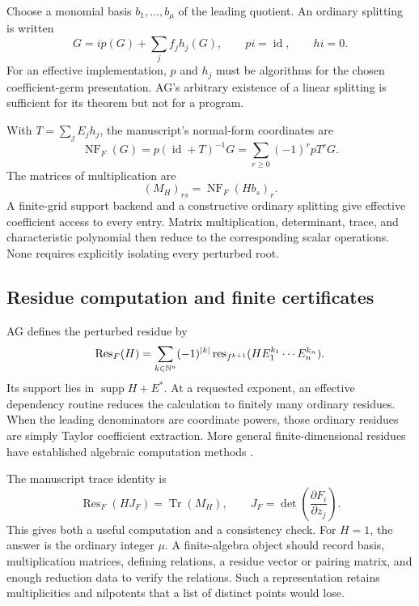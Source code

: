 \documentclass[11pt,letterpaper]{article}
\theoremstyle{definition}\newtheorem{definition}[theorem]{Definition}
\theoremstyle{remark}\newtheorem{remark}[theorem]{Remark}
\newcommand{\supp}{\operatorname{supp}}\newcommand{\lc}{\operatorname{lc}}
\newcommand{\Res}{\operatorname{Res}}\newcommand{\res}{\operatorname{res}}
\newcommand{\NF}{\operatorname{NF}}\newcommand{\Tr}{\operatorname{Tr}}
\newcommand{\id}{\operatorname{id}}\newcommand{\vH}{v_{\!H}}
\numberwithin{equation}{section}\setcounter{tocdepth}{2}
\begin{document}
Choose a monomial basis $b_1,\ldots,b_\mu$ of the leading quotient. An ordinary splitting is written
\[
 G=i p(G)+\sum_j f_jh_j(G),\qquad pi=\id,\qquad hi=0.
\]
For an effective implementation, $p$ and $h_j$ must be algorithms for the chosen coefficient-germ presentation. AG's arbitrary existence of a linear splitting is sufficient for its theorem but not for a program.

With $T=\sum_j E_jh_j$, the manuscript's normal-form coordinates are
\begin{equation}\label{eq:NFalgorithm}
 \NF_F(G)=p(\id+T)^{-1}G
 =\sum_{r\ge0}(-1)^r pT^rG.
\end{equation}
The matrices of multiplication are
\begin{equation}\label{eq:multiplication}
 (M_H)_{rs}=\NF_F(Hb_s)_r.
\end{equation}
A finite-grid support backend and a constructive ordinary splitting give effective coefficient access to every entry. Matrix multiplication, determinant, trace, and characteristic polynomial then reduce to the corresponding scalar operations. None requires explicitly isolating every perturbed root.

\subsection{Residue computation and finite certificates}
AG defines the perturbed residue by
\begin{equation}\label{eq:residuealgorithm}
 \Res_F(H)=\sum_{k\in\N^n}(-1)^{|k|}
 \res_{f^{k+1}}(H E_1^{k_1}\cdots E_n^{k_n}).
\end{equation}
Its support lies in $\supp H+E^*$. At a requested exponent, an effective dependency routine reduces the calculation to finitely many ordinary residues. When the leading denominators are coordinate powers, those ordinary residues are simply Taylor coefficient extraction. More general finite-dimensional residues have established algebraic computation methods \cite{CDS}.

The manuscript trace identity is
\begin{equation}\label{eq:traceidentity}
 \Res_F(HJ_F)=\Tr(M_H),\qquad
 J_F=\det\left(\frac{\partial F_i}{\partial z_j}\right).
\end{equation}
This gives both a useful computation and a consistency check. For $H=1$, the answer is the ordinary integer $\mu$. A finite-algebra object should record basis, multiplication matrices, defining relations, a residue vector or pairing matrix, and enough reduction data to verify the relations. Such a representation retains multiplicities and nilpotents that a list of distinct points would lose.
\end{document}
